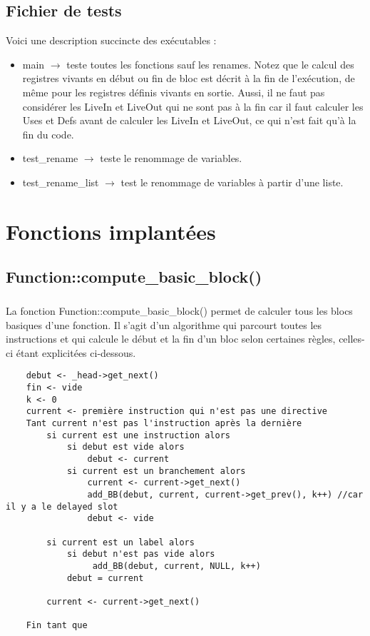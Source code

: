 \documentclass[a4paper,12pt]{report}
\begin{document}
\section{Fichier de tests}
Voici une description succincte des exécutables :
\begin{itemize}
    \item main $\rightarrow$ teste toutes les fonctions sauf les renames. Notez que le calcul des registres vivants en début ou fin de bloc est décrit à la fin de l'exécution, de même pour les registres définis vivants en sortie. Aussi, il ne faut pas considérer les LiveIn et LiveOut qui ne sont pas à la fin car il faut calculer les Uses et Defs avant de calculer les LiveIn et LiveOut, ce qui n'est fait qu'à la fin du code.
    \item test\_rename $\rightarrow$ teste le renommage de variables.
    \item test\_rename\_list $\rightarrow$ test le renommage de variables à partir d'une liste.
\end{itemize}

\chapter{Fonctions implantées}
\paragraph*{}
\section{Function::compute\_basic\_block()}
\paragraph*{}
La fonction Function::compute\_basic\_block() permet de calculer tous les blocs basiques d'une fonction.
Il s'agit d'un algorithme qui parcourt toutes les instructions et qui calcule le début et la fin d'un bloc selon certaines règles, celles-ci étant explicitées ci-dessous.

\begin{verbatim}
    debut <- _head->get_next()
    fin <- vide
    k <- 0
    current <- première instruction qui n'est pas une directive
    Tant current n'est pas l'instruction après la dernière
        si current est une instruction alors
            si debut est vide alors
                debut <- current
            si current est un branchement alors
                current <- current->get_next()
                add_BB(debut, current, current->get_prev(), k++) //car il y a le delayed slot
                debut <- vide
        
        si current est un label alors
            si debut n'est pas vide alors
                 add_BB(debut, current, NULL, k++)
            debut = current
        
        current <- current->get_next()
    
    Fin tant que
\end{verbatim}
\end{document}
